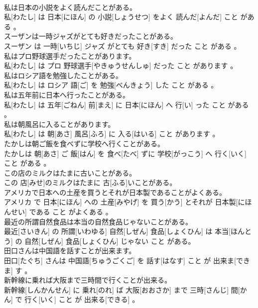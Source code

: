 \documentclass[8pt]{extreport}
\begin{document}
\begin{CJK}{UTF8}{min}
\\	私は日本の小説をよく読んだことがある。	
\\	私[わたし] は 日本[にほん] の 小説[しょうせつ] をよく 読んだ[よんだ] こと がある 。
\\	スーザンは一時ジャズがとても好きだったことがある。	
\\	スーザン は 一時[いちじ] ジャズ がとても 好き[すき] だった こと がある 。
\\	私はプロ野球選手だったことがあります。	
\\	私[わたし] は プロ 野球選手[やきゅうせんしゅ] だった こと があります 。
\\	私はロシア語を勉強したことがある。	
\\	私[わたし] は ロシア 語[ご] を 勉強[べんきょう] した こと がある 。
\\	私は五年前に日本へ行ったことがある。	
\\	私[わたし] は 五年[ごねん] 前[まえ] に 日本[にほん] へ 行[い] った こと がある 。
\\	私は朝風呂に入ることがあります。	
\\	私[わたし] は 朝[あさ] 風呂[ふろ] に 入る[はいる] こと があります 。
\\	たかしは朝ご飯を食べずに学校へ行くことがある。	
\\	たかしは 朝[あさ] ご 飯[はん] を 食べ[たべ] ずに 学校[がっこう] へ 行く[いく] こと がある 。
\\	この店のミルクはたまに古いことがある。	
\\	この 店[みせ]のミルクはたまに 古[ふる]いことがある。
\\	アメリカで日本への土産を買うとそれが日本製であることがよくある。	
\\	アメリカ で 日本[にほん] への 土産[みやげ] を 買う[かう] とそれが 日本製[にほんせい] である こと がよくある 。
\\	最近の所謂自然食品は本当の自然食品じゃないことがある。	
\\	最近[さいきん] の 所謂[いわゆる] 自然[しぜん] 食品[しょくひん] は 本当[ほんとう] の 自然[しぜん] 食品[しょくひん] じゃない こと がある。
\\	田口さんは中国語を話すことが出来ます。	
\\	田口[たぐち] さんは 中国語[ちゅうごくご] を 話す[はなす] こと が 出来ま[できま] す 。
\\	新幹線に乗れば大阪まで三時間で行くことが出来る。	
\\	新幹線[しんかんせん] に 乗れ[のれ] ば 大阪[おおさか] まで 三時[さんじ] 間[かん] で 行く[いく] こと が 出来る[できる] 。

\end{CJK}
\end{document}
